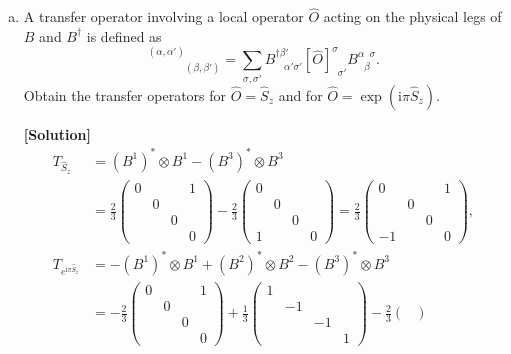 \documentclass[11pt,a4paper,oneside]{article}
\begin{document}
\begin{enumerate}[(a)]
\item
A transfer operator involving a local operator $\hat{O}$ acting on the physical legs of $B$ and $B^\dagger$ is defined as
\begin{equation}
[T_{\hat{O}}]^{(\alpha, \alpha')}_{\phantom{(\alpha, \alpha')} (\beta, \beta')} 
= \sum_{\sigma, \sigma'} B^{\dagger \beta'}_{\phantom{\beta'} \alpha'  \sigma'}
[\hat{O}]^{\sigma}_{\phantom{\sigma} \sigma'}
B^{\alpha \phantom{\beta} \sigma}_{\phantom{\alpha} \beta} .
\end{equation}
Obtain the transfer operators for $\hat{O} = \hat{S}_z$ and for $\hat{O} = \exp (\mathrm{i} \pi \hat{S}_z)$.

\textbf{[Solution]}
\begin{equation}
\begin{aligned}
T_{\hat{S}_z} &=
(B^1)^* \otimes B^1 -
(B^3)^* \otimes B^3
\\
&=
\frac{2}{3}
\begin{pmatrix}
0 & & & 1 \\
& 0 & & \\
& & 0 & \\
& & & 0
\end{pmatrix}
-
\frac{2}{3}
\begin{pmatrix}
0 & & & \\
& 0 & & \\
& & 0 & \\
1 & & & 0
\end{pmatrix}
=
\frac{2}{3}
\begin{pmatrix}
0 & & & 1 \\
& 0 & & \\
& & 0 & \\
-1 & & & 0
\end{pmatrix},
\\
T_{e^{\mathrm{i} \pi \hat{S}_z}} &=
- (B^1)^* \otimes B^1
+ (B^2)^* \otimes B^2 
- (B^3)^* \otimes B^3
\\
&=
- \frac{2}{3}
\begin{pmatrix}
0 & & & 1 \\
& 0 & & \\
& & 0 & \\
& & & 0
\end{pmatrix}
+
\frac{1}{3}
\begin{pmatrix}
1 & & & \\
& -1 & & \\
& & -1 & \\
& & & 1
\end{pmatrix}
-
\frac{2}{3}
\begin{pmatrix}

\end{pmatrix}
\end{aligned}
\end{equation}
\end{enumerate}
\end{document}

